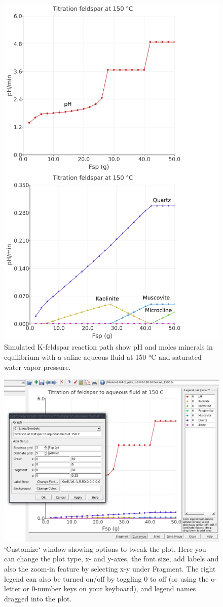 \documentclass[
]{book}
\begin{document}
\begin{figure}
\includegraphics[width=0.8\linewidth]{figures/module2/fig-14} \caption{Simulated K-feldspar reaction path show pH and moles minerals in equilibrium with a saline aqueous fluid at 150 °C and saturated water vapor pressure.}\label{fig:fig-14b}
\end{figure}

\begin{figure}
\includegraphics[width=0.8\linewidth]{figures/module2/fig-15} \caption{`Customize` window showing options to tweak the plot. Here you can change the plot type, x- and y-axes, the font size, add labels and also the zoom-in feature by selecting x-y under Fragment. The right legend can also be turned on/off by toggling 0 to off (or using the o-letter or 0-number keys on your keyboard), and legend names dragged into the plot.}\label{fig:fig-15b}
\end{figure}
\end{document}
